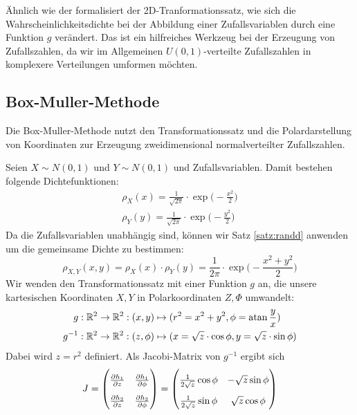 Ähnlich wie der  formalisiert der
2D-Tranformationssatz, wie sich die Wahrscheinlichkeitsdichte bei der Abbildung
einer Zufallsvariablen durch eine Funktion $g$ verändert. Das ist ein hilfreiches
Werkzeug bei der Erzeugung von Zufallszahlen, da wir im Allgemeinen
$U(0,1)$-verteilte Zufallszahlen in komplexere Verteilungen umformen möchten.

\subsection{Box-Muller-Methode}

Die Box-Muller-Methode nutzt den Transformationssatz und die Polardarstellung
von Koordinaten zur Erzeugung zweidimensional normalverteilter Zufallszahlen.

Seien $X\sim N(0,1)$ und $Y\sim N(0,1)$ 
und  Zufallsvariablen. Damit bestehen folgende
Dichtefunktionen:
\begin{align*}
\rho_X(x) = \frac{1}{\sqrt{2\pi}}\cdot\exp\Big(-\frac{x^2}{2}\Big)\\
\rho_Y(y) = \frac{1}{\sqrt{2\pi}}\cdot\exp\Big(-\frac{y^2}{2}\Big)
\end{align*}
Da die Zufallsvariablen unabhängig sind, können wir Satz \ref{satz:randd}
anwenden um die gemeinsame Dichte zu bestimmen:
\[
\rho_{X,Y}(x,y) = \rho_X(x)\cdot\rho_Y(y) =
\frac{1}{2\pi}\cdot\exp\Big(-\frac{x^2+y^2}{2}\Big)
\]
Wir wenden den Transformationssatz mit einer Funktion $g$ an, die unsere
kartesischen Koordinaten $X,Y$ in Polarkoordinaten  $Z,\Phi$
umwandelt:
\begin{align*}
g: \mathbb{R}^2 \to \mathbb{R}^2: (x,y) &\mapsto (r^2 =x^2+y^2,\phi=\operatorname{atan}\frac{y}{x}) \\
g^{-1}: \mathbb{R}^2 \to \mathbb{R}^2: (z,\phi) &\mapsto (x=\sqrt{z}\cdot\cos\phi,y=\sqrt{z}\cdot\sin\phi)
\end{align*}
Dabei wird $z=r^2$ definiert. Als Jacobi-Matrix von $g^{-1}$ ergibt sich
\[
\renewcommand*{\arraystretch}{1.8}
J = \begin{pmatrix}\pd{h_1}{z} & \pd{h_1}{\phi} \\ \pd{h_2}{z} & \pd{h_2}{\phi}\end{pmatrix}
 = \begin{pmatrix}\frac{1}{2\sqrt{z}}\cos\phi & -\sqrt{z}\sin\phi \\
                  \frac{1}{2\sqrt{z}}\sin\phi &  \sqrt{z}\cos\phi\end{pmatrix}
\]
